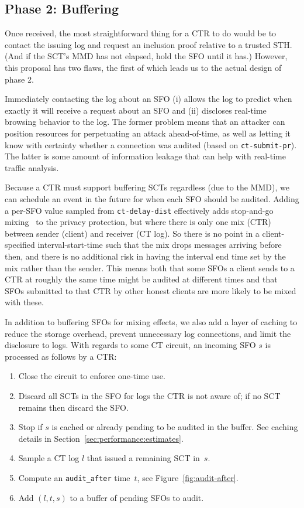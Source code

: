 \subsection{Phase 2: Buffering} \label{sec:base:phase2}

Once received, the most straightforward thing for a CTR to do would be to
contact the issuing log and request an inclusion proof relative to a trusted
STH\@. (And if the SCT's MMD has not elapsed, hold the SFO until it has.)
However, this proposal has two flaws, the first of which leads us to the actual
design of phase 2.

Immediately contacting the log about an SFO (i) allows the log to predict when
exactly it will receive a request about an SFO and (ii) discloses real-time
browsing behavior to the log. The former problem means that an attacker can
position resources for perpetuating an attack ahead-of-time, as well as letting
it know with certainty whether a connection was audited (based on
\texttt{ct-submit-pr}). The latter is some amount of information leakage that
can help with real-time traffic analysis.

Because a CTR must support buffering SCTs regardless (due to the MMD), we can
schedule an event in the future for when each SFO should be audited. Adding a
per-SFO value sampled from \texttt{ct-delay-dist} effectively adds stop-and-go
mixing~\cite{kesdogan:ih1998} to the privacy protection, but where there is only
one mix (CTR) between sender (client) and receiver (CT log). So there is no
point in a client-specified interval-start-time such that the mix drops messages
arriving before then, and there is no additional risk in having the interval end
time set by the mix rather than the sender. This means both that some SFOs a
client sends to a CTR at roughly the same time might be audited at different
times and that SFOs submitted to that CTR by other honest clients are more
likely to be mixed with these.

In addition to buffering SFOs for mixing effects, we also add a layer of caching
to reduce the storage overhead, prevent unnecessary log connections, and limit
the disclosure to logs. With regards to some CT circuit, an incoming SFO $s$ is
processed as follows by a CTR:
\begin{enumerate}
    \item\label{enm:storage:close} Close the circuit to enforce one-time use.
    \item\label{enm:storage:unrecognized} Discard all SCTs in the SFO for logs
        the CTR is not aware of; if no SCT remains then discard the SFO\@.
	\item\label{enm:storage:cached} Stop if $s$ is cached or already pending to
		be audited in the buffer.  See caching details in
		Section~\ref{sec:performance:estimates}.
    \item\label{enm:storage:fix-log} Sample a CT log $l$ that issued a
        remaining SCT in~$s$.
    \item\label{enm:storage:audit-after} Compute an \texttt{audit\_after}
		time~$t$, see Figure~\ref{fig:audit-after}.
    \item\label{enm:storage:store} Add $(l,t,s)$ to a buffer of pending SFOs to
    audit.
\end{enumerate}

